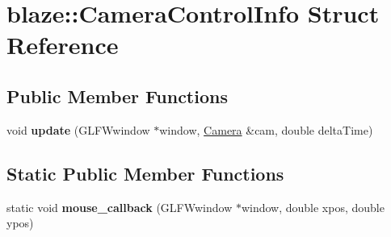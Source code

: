 \hypertarget{structblaze_1_1CameraControlInfo}{}\section{blaze\+:\+:Camera\+Control\+Info Struct Reference}
\label{structblaze_1_1CameraControlInfo}
\subsection*{Public Member Functions}
\begin{DoxyCompactItemize}
\item 
\mbox{\label{structblaze_1_1CameraControlInfo_a16405cd6b36f566bfe8e98f48c48c7ad}} 
void {\bfseries update} (G\+L\+F\+Wwindow $\ast$window, \hyperlink{classblaze_1_1Camera}{Camera} \&cam, double delta\+Time)
\end{DoxyCompactItemize}
\subsection*{Static Public Member Functions}
\begin{DoxyCompactItemize}
\item 
\mbox{\label{structblaze_1_1CameraControlInfo_a7215ebf1d99129ffaae011a39ffa8e2d}} 
static void {\bfseries mouse\+\_\+callback} (G\+L\+F\+Wwindow $\ast$window, double xpos, double ypos)
\end{DoxyCompactItemize}
